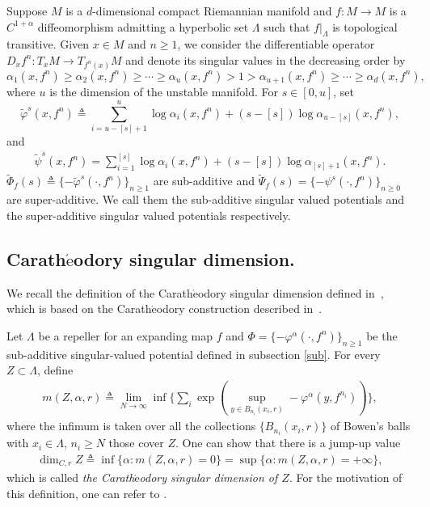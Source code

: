 \documentclass[11pt,a4paper]{amsart}
\theoremstyle{plain}
\theoremstyle{remark}
\begin{document}
	Suppose $M$ is a $d$-dimensional compact Riemannian manifold and $f:M\rightarrow M$ is a $C^{1+\alpha}$ diffeomorphism admitting a hyperbolic set $\Lambda$ such that $f|_{\Lambda}$ is topological transitive. Given $x\in M$ and $n\geq 1$, we consider the differentiable operator $D_{x}f^{n}: T_{x}M\rightarrow T_{f^{n}(x)}M$ and denote its singular values in the decreasing order by
	$$\alpha_{1}(x,f^{n})\geq\alpha_{2}(x,f^{n})\geq\cdots\geq \alpha_{u}(x,f^{n})>1>\alpha_{u+1}(x,f^{n})\geq\cdots\geq \alpha_{d}(x,f^{n}),$$ where $u$ is the dimension of the unstable manifold.
	For $s\in [0,u]$, set
	$$\tilde{\varphi}^{s}(x,f^{n})\triangleq\sum^{u}_{i=u-[s]+1} \log \alpha_{i}(x,f^{n})+(s-[s])\log\alpha_{u-[s]}(x,f^{n}),$$
	and
	\begin{align*}
		\tilde{\psi}^{s}(x,f^{n})=\sum_{i=1}^{[s]}\log \alpha_{i}(x,f^{n})+(s-[s])\log \alpha_{[s]+1}(x,f^{n}).
	\end{align*}
	$\tilde{\Phi}_{f}(s)\triangleq \{-\tilde{\varphi}^{s}(\cdot,f^{n})\}_{n\geq 1}$ are sub-additive and $\tilde{\Psi}_{f}(s)=\{-\psi^{s}(\cdot,f^{n})\}_{n\geq 0}$ are super-additive. We call them the sub-additive singular valued potentials and the super-additive singular valued potentials respectively.
	\fi
	
	
	
	
	\subsection{Carath$\acute{\text{e}}$odory singular dimension.}\label{C dimension} We recall the definition of the Carath$\acute{\text{e}}$odory singular dimension defined in~\cite{caopesinzhao2019}, which is based on the Carath$\acute{\text{e}}$odory construction described in~\cite{Pesin}.
	
	Let $\Lambda$ be a repeller for an expanding map $f$ and $\Phi=\{-\varphi^{\alpha}(\cdot,f^{n})\}_{n\geq 1}$ be the sub-additive singular-valued potential defined in  subsection \ref{sub}. For every $Z\subset \Lambda$, define
	\begin{align*}
		m(Z,\alpha,r)\triangleq \lim_{N\rightarrow \infty} \inf\{\sum_{i}\exp(\sup_{y\in B_{n_{i}}(x_{i},r)} -\varphi^{\alpha}(y,f^{n_{i}}))\},
	\end{align*}
	where the infimum is taken over all the collections $\{B_{n_{i}}(x_{i},r)\}$ of Bowen's balls with $x_{i}\in \Lambda$, $n_{i}\geq N$ those cover $Z$. One can show that there is a jump-up value
	\begin{align*}
		\dim_{C,r} Z\triangleq \inf\{\alpha:m(Z,\alpha,r)=0\}=\sup\{\alpha:m(Z,\alpha,r)=+\infty\},
	\end{align*}
	which is called {\it the Carath$\acute{\text{e}}$odory singular dimension of $Z$}. For the motivation of this definition, one can refer to \cite{caopesinzhao2019}.

	
\end{document}
